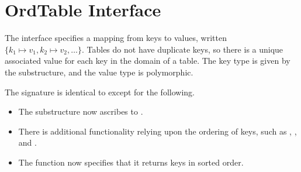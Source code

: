 \chapter{OrdTable Interface}
\label{ch:ordtable-interface}
\begin{preamble}
The  interface specifies a mapping from keys to values, written
$\{k_1 \mapsto v_1, k_2 \mapsto v_2, \ldots\}$. Tables do not have duplicate
keys, so there is a unique associated value for each key in the domain of
a table. The key type is given by the  substructure, and the value
type is polymorphic.
\end{preamble}

\begin{note}
The  signature is identical to  except for the following.
\begin{itemize}
  \item The  substructure now ascribes to .
  \item There is additional functionality relying upon the ordering of keys,
  such as , , and .
  \item The  function now specifies that it returns keys in sorted order.
\end{itemize}
\end{note}

